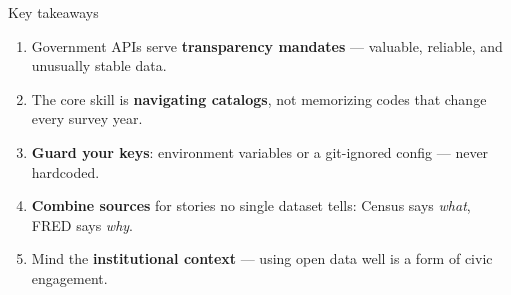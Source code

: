 \documentclass[9pt,aspectratio=169]{beamer}
\begin{document}
\begin{frame}{Key takeaways}
    \begin{enumerate}
        \item Government APIs serve \textbf{transparency mandates} --- valuable, reliable, and unusually stable data.
        \item The core skill is \textbf{navigating catalogs}, not memorizing codes that change every survey year.
        \item \textbf{Guard your keys}: environment variables or a git-ignored config --- never hardcoded.
        \item \textbf{Combine sources} for stories no single dataset tells: Census says \textit{what}, FRED says \textit{why}.
        \item Mind the \textbf{institutional context} --- using open data well is a form of civic engagement.
    \end{enumerate}
    \vspace{1em}
\end{frame}
\end{document}
